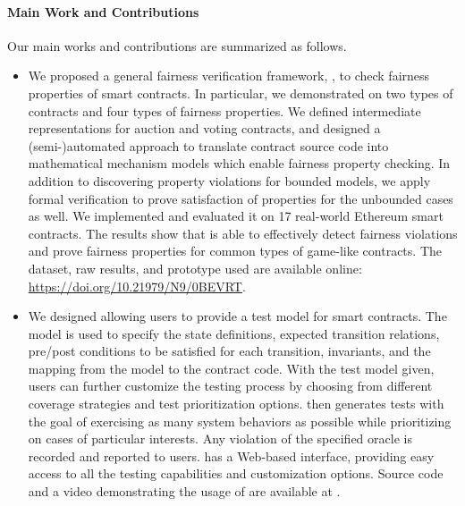\paragraph{Main Work and Contributions}
Our main works and contributions are summarized as follows.
\begin{itemize}[leftmargin=*,topsep=4pt]
\item We proposed a general fairness verification framework, \faircon, to check fairness properties of
smart contracts.
In particular, we demonstrated \faircon on two types of contracts and four types of fairness
properties.
We defined intermediate representations for auction and voting contracts, and designed a
(semi-)automated approach to translate contract source code into mathematical mechanism models
which enable fairness property checking.
In addition to discovering property violations for bounded models, we apply formal
verification to prove satisfaction of properties for the unbounded cases as well.
We implemented \faircon and evaluated it on 17 real-world Ethereum smart contracts.
The results show that \faircon is able to effectively detect fairness violations and prove fairness
properties for common types of game-like contracts.
The dataset, raw results, and prototype used are available online:
\url{https://doi.org/10.21979/N9/0BEVRT}.

\item We designed \modcon allowing users to provide a test model for smart contracts. 
The model is used to specify the state definitions, expected transition relations,
pre/post conditions to be satisfied for each transition, invariants, and the mapping from the
model to the contract code.
With the test model given, users can further customize the testing process by choosing from
different coverage strategies and test prioritization options.
\modcon then generates tests with the goal of exercising as many system behaviors as possible while
prioritizing on cases of particular interests.
Any violation of the specified oracle is recorded and reported to users.
\modcon has a Web-based interface, providing easy access to all the testing capabilities and
customization options.
Source code and a video demonstrating the usage of \modcon are available at \modconurl.

\end{itemize}

